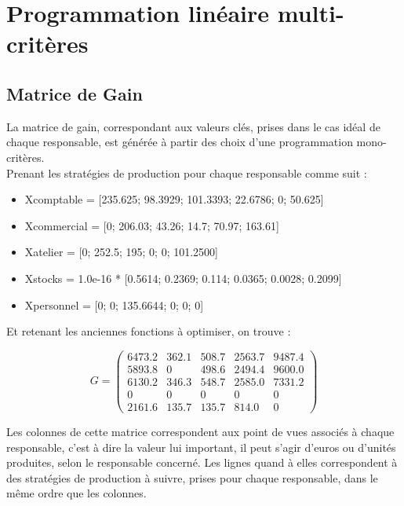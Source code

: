 \documentclass{article}
\begin{document}
\section{Programmation linéaire multi-critères}

\subsection{Matrice de Gain}

La matrice de gain, correspondant aux valeurs clés, prises dans le cas
idéal de chaque responsable, est générée à partir des choix d'une
programmation mono-critères. \\

Prenant les stratégies de production pour chaque responsable comme suit :

\begin{itemize}
    \item Xcomptable = [235.625; 98.3929; 101.3393; 22.6786; 0; 50.625]
    \item Xcommercial = [0; 206.03; 43.26; 14.7; 70.97; 163.61]
    \item Xatelier = [0; 252.5; 195; 0; 0; 101.2500]
    \item Xstocks = 1.0e-16 * [0.5614; 0.2369; 0.114; 0.0365; 0.0028; 0.2099]
    \item Xpersonnel = [0; 0; 135.6644; 0; 0; 0]
\end{itemize}

Et retenant les anciennes fonctions à optimiser, on trouve :

$$
G =
\left (
    \begin{array}{ccccc}
        6473.2 & 362.1 & 508.7 & 2563.7 & 9487.4 \\
        5893.8 &     0 & 498.6 & 2494.4 & 9600.0 \\
        6130.2 & 346.3 & 548.7 & 2585.0 & 7331.2 \\
        0 &     0 &     0 &      0 &      0 \\
        2161.6 & 135.7 & 135.7 &  814.0 &      0
    \end{array}
\right )
$$

Les colonnes de cette matrice correspondent aux point de vues associés à chaque
responsable, c'est à dire la valeur lui important, il peut s'agir d'euros ou
d'unités produites, selon le responsable concerné. Les lignes quand à elles
correspondent à des stratégies de production à suivre, prises pour chaque
responsable, dans le même ordre que les colonnes. \\
\end{document}
